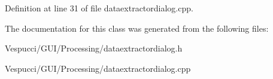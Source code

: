 Definition at line 31 of file dataextractordialog.\+cpp.



The documentation for this class was generated from the following files\+:\begin{DoxyCompactItemize}
\item 
Vespucci/\+G\+U\+I/\+Processing/dataextractordialog.\+h\item 
Vespucci/\+G\+U\+I/\+Processing/dataextractordialog.\+cpp\end{DoxyCompactItemize}
